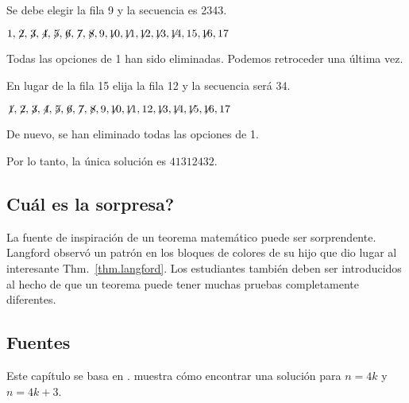 \noindent Se debe elegir la fila 9 y la secuencia es 2{}34{}3.

$1,\not\! 2,\not\! 3,\not\! 4,\not\! 5,\not\! 6,\not\! 7,\not\! 8,9,\not\!\! 10,\not\!\! 11,\not\!\! 12,\not\!\! 13,\not\!\! 14,15,\not\!\! 16,17$

\noindent Todas las opciones de 1 han sido eliminadas. Podemos retroceder una última vez. 

\smallskip

\noindent En lugar de la fila 15 elija la fila 12 y la secuencia será 3{}4\textvisiblespace {}.

$\not\! 1,\not\! 2,\not\! 3,\not\! 4,\not\! 5,\not\! 6,\not\! 7,\not\! 8,9,\not\!\! 10,\not\!\! 11,12,\not\!\! 13,\not\!\! 14,\not\!\! 15,\not\!\! 16,17$

\noindent De nuevo, se han eliminado todas las opciones de 1.

\medskip

\noindent Por lo tanto, la única solución es $41312432$.

\subsection*{Cuál es la sorpresa?}

La fuente de inspiración de un teorema matemático puede ser sorprendente. Langford observó un patrón en los bloques de colores de su hijo que dio lugar al interesante Thm.~\ref{thm.langford}. Los estudiantes también deben ser introducidos al hecho de que un teorema puede tener muchas pruebas completamente diferentes.

\subsection*{Fuentes}
Este capítulo se basa en \cite{miller}. \cite{davies} muestra cómo encontrar una solución para $n=4k$ y $n=4k+3$.
